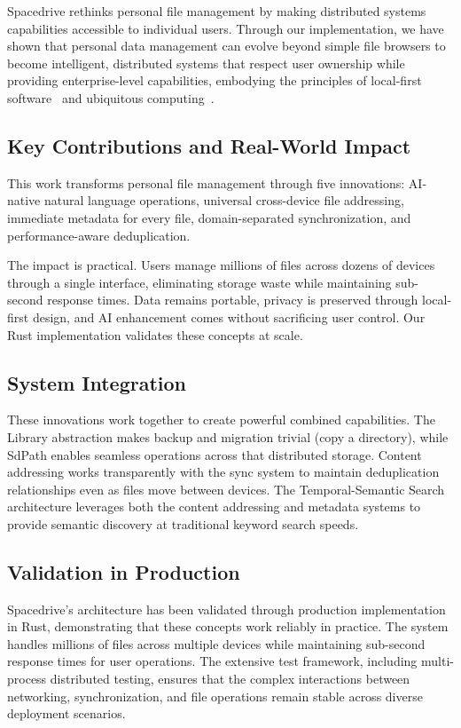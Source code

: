\documentclass[sigconf]{acmart}
\begin{document}
Spacedrive rethinks personal file management by making distributed systems capabilities accessible to individual users. Through our implementation, we have shown that personal data management can evolve beyond simple file browsers to become intelligent, distributed systems that respect user ownership while providing enterprise-level capabilities, embodying the principles of local-first software~\cite{kleppmann_localfirst_2019} and ubiquitous computing~\cite{weiser_ubiquitous_1991}.

\subsection{Key Contributions and Real-World Impact}
This work transforms personal file management through five innovations: AI-native natural language operations, universal cross-device file addressing, immediate metadata for every file, domain-separated synchronization, and performance-aware deduplication.

The impact is practical. Users manage millions of files across dozens of devices through a single interface, eliminating storage waste while maintaining sub-second response times. Data remains portable, privacy is preserved through local-first design, and AI enhancement comes without sacrificing user control. Our Rust implementation validates these concepts at scale.

\subsection{System Integration}
These innovations work together to create powerful combined capabilities. The Library abstraction makes backup and migration trivial (copy a directory), while SdPath enables seamless operations across that distributed storage. Content addressing works transparently with the sync system to maintain deduplication relationships even as files move between devices. The Temporal-Semantic Search architecture leverages both the content addressing and metadata systems to provide semantic discovery at traditional keyword search speeds.

\subsection{Validation in Production}
Spacedrive's architecture has been validated through production implementation in Rust, demonstrating that these concepts work reliably in practice. The system handles millions of files across multiple devices while maintaining sub-second response times for user operations. The extensive test framework, including multi-process distributed testing, ensures that the complex interactions between networking, synchronization, and file operations remain stable across diverse deployment scenarios.
\end{document}
